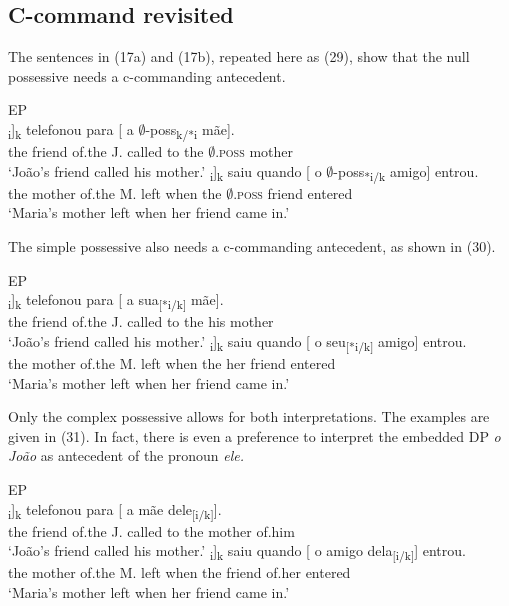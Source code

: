 \documentclass[output=paper]{langsci/langscibook}
\begin{document}
\subsection{C-command revisited}%

The sentences in (17a) and (17b), repeated here as (29), show that the null possessive needs a c-commanding antecedent.

\ea%
    EP\label{ex:wein:29}\\
    \ea
    \gll \relax[ O amigo d[o João]\textsubscript{i}]\textsubscript{k} telefonou para [ a $\emptyset$-poss\textsubscript{k/*i} mãe].\\
         {} the friend of.the J. called   to {} the $\emptyset$\textsc{.poss} mother\\
    \glt ‘João’s friend called his mother.’
    \ex  
    \gll \relax [ A mãe d[a Maria]\textsubscript{i}]\textsubscript{k} saiu quando [ o $\emptyset$-poss\textsubscript{*i/k} amigo] entrou.\\
         {} the mother of.the M. left when {} the $\emptyset$\textsc{.poss} friend entered\\
    \glt ‘Maria’s mother left when her friend came in.’
    \z
\z    


The simple possessive also needs a c-commanding antecedent, as shown in (30).

\ea%
    EP\label{ex:wein:30}\\
    \ea
    \gll \relax[ O amigo d[o João]\textsubscript{i}]\textsubscript{k} telefonou para [ a   sua\textsubscript{[*i/k]} mãe].\\
         {} the friend of.the J. called   to {} the his mother\\
    \glt ‘João’s friend called his mother.’
    \ex  
    \gll \relax[ A mãe d[a Maria]\textsubscript{i}]\textsubscript{k} saiu quando [ o seu\textsubscript{[*i/k]} amigo] entrou.\\
        {} the mother of.the M. left when {} the her friend entered\\
    \glt ‘Maria’s mother left when her friend came in.’
    \z
\z

Only the complex possessive allows for both interpretations. The examples are given in (31). In fact, there is even a preference to interpret the embedded DP \textit{o João} as antecedent of the pronoun \textit{ele.}

\ea%
         EP\label{ex:wein:31}\\
    \ea  
    \gll \relax [ O amigo d[o João]\textsubscript{i}]\textsubscript{k} telefonou para [ a mãe dele\textsubscript{[i/k]}].\\
         {} the friend of.the J. called to {} the mother of.him\\
    \glt ‘João’s friend called his mother.’
    \ex  
    \gll \relax [ A mãe d[a Maria]\textsubscript{i}]\textsubscript{k} saiu quando [ o amigo dela\textsubscript{[i/k]}] entrou.\\
         {} the mother of.the M. left when {} the friend of.her entered\\
    \glt ‘Maria’s mother left when her friend came in.’
    \z
\z
\end{document}
